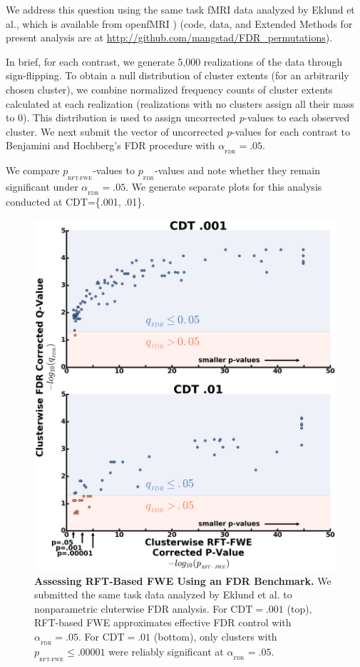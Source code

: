 \documentclass[9pt,twocolumn,twoside]{pnas-new}
\newcommand{\subtext}[2]{
#1_{_{\text{#2}}}
}
\begin{document}
We address this question using the same task fMRI data \cite{duncan_consistency_2009,tom_neural_2007} analyzed by Eklund et al., which is available from openfMRI \cite{poldrack_toward_2013})  (code, data, and Extended Methods for present analysis are at \url{http://github.com/mangstad/FDR_permutations}).

In brief, for each contrast, we generate 5,000 realizations of the data through sign-flipping. 
To obtain a null distribution of cluster extents (for an arbitrarily chosen cluster), we combine normalized frequency counts of cluster extents calculated at each realization (realizations with no clusters assign all their mass to 0). 
This distribution is used to assign uncorrected \textit{p}-values to each observed cluster. 
We next submit the vector of uncorrected \textit{p}-values for each contrast to Benjamini and Hochberg's \cite{fdr} FDR procedure with $\subtext{\alpha}{FDR}=.05$.
 
We compare $\subtext{p}{RFT-FWE}$-values to $\subtext{p}{FDR}$-values and note whether they remain significant under $\subtext{\alpha}{FDR}=.05$. 
We generate separate plots for this analysis conducted at CDT=\{.001, .01\}.

\begin{figure}[ht]
\includegraphics[width=1.0\textwidth]{../Results/FDR_surviving_clusters.png}
\centering
\caption{
\textbf{Assessing RFT-Based FWE Using an FDR Benchmark.}
We submitted the same task data analyzed by Eklund et al. to nonparametric cluterwise FDR analysis. For $\text{CDT}=.001$ (top), RFT-based FWE approximates effective FDR control with $\subtext{\alpha}{FDR} = .05$. For $\text{CDT}=.01$ (bottom), only clusters with $\subtext{p}{RFT-FWE} \leq .00001$ were reliably significant at $\subtext{\alpha}{FDR}=.05$. 
\label{fig:p-plot}
}
\end{figure} 
\end{document}
